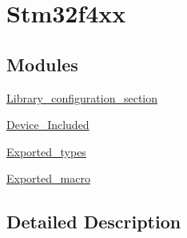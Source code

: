 \hypertarget{group__stm32f4xx}{}\section{Stm32f4xx}
\label{group__stm32f4xx}
\subsection*{Modules}
\begin{DoxyCompactItemize}
\item 
\mbox{\hyperlink{group___library__configuration__section}{Library\+\_\+configuration\+\_\+section}}
\item 
\mbox{\hyperlink{group___device___included}{Device\+\_\+\+Included}}
\item 
\mbox{\hyperlink{group___exported__types}{Exported\+\_\+types}}
\item 
\mbox{\hyperlink{group___exported__macro}{Exported\+\_\+macro}}
\end{DoxyCompactItemize}


\subsection{Detailed Description}
